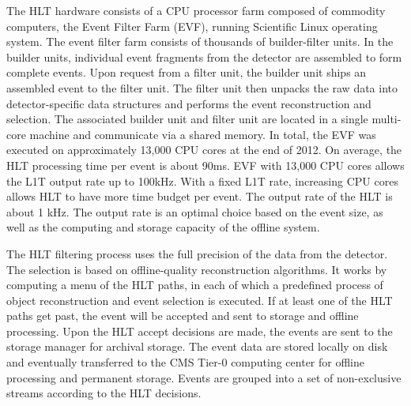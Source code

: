 The HLT hardware consists of a CPU processor farm composed of commodity computers, the Event Filter Farm (EVF), running Scientific Linux operating system. The event filter farm consists of thousands of builder-filter units. In the builder units, individual event fragments from the detector are assembled to form complete events. Upon request from a filter unit, the builder unit ships an assembled event to the filter unit. The filter unit then unpacks the raw data into detector-specific data structures and performs the event reconstruction and selection. The associated builder unit and filter unit are located in a single multi-core machine and communicate via a shared memory. In total, the EVF was executed on approximately 13,000 CPU cores at the end of 2012. On average, the HLT processing time per event is about 90\unit{ms}. EVF with 13,000 CPU cores allows the L1T output rate up to 100\unit{kHz}. With a fixed L1T rate, increasing CPU cores allows HLT to have more time budget per event. The output rate of the HLT is about 1 kHz. The output rate is an optimal choice based on the event size, as well as the computing and storage capacity of the offline system.

The HLT filtering process uses the full precision of the data from the detector. The selection is based on offline-quality reconstruction algorithms. It works by computing a menu of the HLT paths, in each of which a predefined process of object reconstruction and event selection is executed. If at least one of the HLT paths get past, the event will be accepted and sent to storage and offline processing. Upon the HLT accept decisions are made, the events are sent to the storage manager for archival storage. The event data are stored locally on disk and eventually transferred to the CMS Tier-0 computing center for offline processing and permanent storage. Events are grouped into a set of non-exclusive streams according to the HLT decisions.
